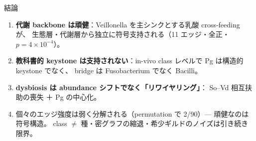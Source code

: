 \documentclass[
  ignorenonframetext,
  aspectratio=169,
]{beamer}
\providecommand{\tightlist}{%
  \setlength{\itemsep}{0pt}\setlength{\parskip}{0pt}}
\begin{document}
\begin{frame}{結論}
\protect\hypertarget{ux7d50ux8ad6}{}
\begin{enumerate}
\tightlist
\item
  \textbf{代謝 backbone は頑健}：Veillonella を主シンクとする乳酸
  cross-feeding が、 生態層・代謝層から独立に符号支持される（11
  エッジ・全正・\(p=4\times10^{-4}\)）。
\item
  \textbf{教科書的 keystone は支持されない}：in-vivo class レベルで Pg
  は構造的 keystone でなく、 bridge は Fusobacterium でなく Bacilli。
\item
  \textbf{dysbiosis は abundance シフトでなく「リワイヤリング」}：
  So--Vd 相互扶助の喪失 ＋ Pg の中心化。
\item
  個々のエッジ強度は弱く分解される（permutation で 2/90）---
  頑健なのは符号構造。 class \(\neq\)
  種・密グラフの縮退・希少ギルドのノイズは引き続き限界。
\end{enumerate}
\end{frame}
\end{document}

